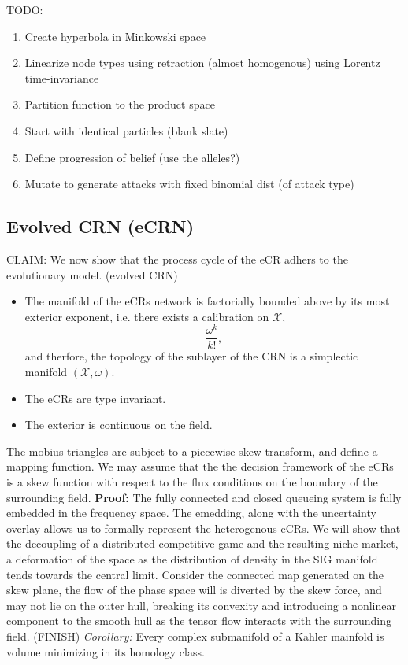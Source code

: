 \documentclass[10pt]{article}
\newcommand{\mcX}{\mathcal{X}}
\theoremstyle{definition}
\begin{document}
{TODO:
\begin{enumerate}
\item Create hyperbola in Minkowski space
\item Linearize node types using retraction (almost homogenous) using Lorentz
time-invariance 
\item Partition function to the product space
\item Start with identical particles (blank slate)
\item Define progression of belief (use the alleles?)
\item Mutate to generate attacks with fixed binomial dist (of attack type)
\end{enumerate}

\subsection{Evolved CRN (eCRN)}
CLAIM: We now show that the process cycle of the eCR adhers to the evolutionary
model. (evolved CRN)
\begin{itemize}
\item The manifold of the eCRs network is factorially bounded above by its
most exterior exponent, i.e. there exists a calibration on $\mcX$,
$$
\frac{\omega^k}{k!},
$$    
and therfore, the topology of the sublayer of the CRN is a simplectic
manifold $(\mcX,\omega)$. 
\item The eCRs are type invariant.
\item The exterior is continuous on the field.
\end{itemize}


The mobius triangles are subject to a piecewise skew transform, and
define a mapping function. We may assume that the the decision framework of
the eCRs is a skew function with respect to the flux conditions on the boundary
of
the surrounding field. 
{
}
\textbf{Proof:}
The fully connected and closed queueing system is fully
embedded in the frequency space. The emedding, along with the uncertainty
overlay allows us to formally represent the heterogenous eCRs. 
We will show that the decoupling of a distributed competitive game 
and the resulting niche market, a deformation of the space as the distribution
of density in the SIG manifold tends towards the central limit. Consider the
connected map generated on the skew plane, the flow of the phase space will
is diverted by the skew force, and may not lie on the outer hull, breaking
its convexity and introducing a nonlinear component to the smooth hull as
the tensor flow interacts with the surrounding field.
(FINISH)
\emph{Corollary:}
Every complex submanifold of a Kahler mainfold is volume minimizing in its
homology class.

}
\end{document}
